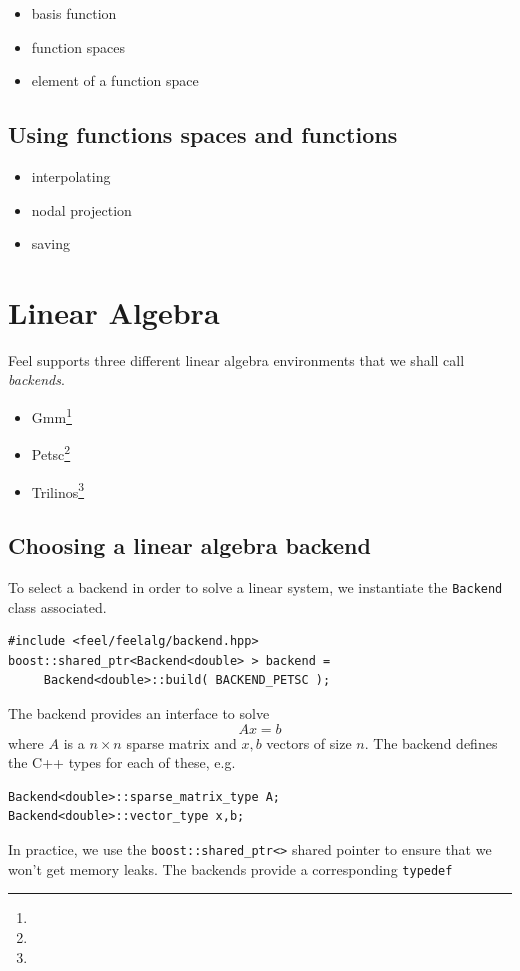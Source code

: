 \documentclass[a4paper]{book}
\newcommand{\cpp}{C{\hspace{-.3em}\vspace{-.2em}\tiny++}\xspace}
\newcommand{\feel}{Feel\xspace}
\begin{document}
\begin{itemize}
\item basis function
\item function spaces
\item element of a function space
\end{itemize}

\subsection{Using functions spaces and functions}

\begin{itemize}
\item interpolating
\item nodal projection
\item saving
\end{itemize}


\section{Linear Algebra}
\label{sec:linear-algebra}


\feel supports three different linear algebra environments that we
shall call \emph{backends}.
\begin{itemize}
\item Gmm\footnote{}
\item Petsc\footnote{}
\item Trilinos\footnote{}
\end{itemize}


\subsection{Choosing a linear algebra backend}
\label{sec:choos-line-algebra}

To select a backend in order to solve a linear system, we instantiate
the \lstinline!Backend! class associated.

\begin{lstlisting}
#include <feel/feelalg/backend.hpp>
boost::shared_ptr<Backend<double> > backend =
     Backend<double>::build( BACKEND_PETSC );
\end{lstlisting}

The backend provides an interface to solve
\begin{equation}
  \label{eq:8}
  A x = b
\end{equation}
\noindent
where $A$ is a $n \times n $ sparse matrix and $x,b$ vectors of size $n$.
The backend defines the \cpp types for  each of these, e.g.
\begin{lstlisting}
Backend<double>::sparse_matrix_type A;
Backend<double>::vector_type x,b;
\end{lstlisting}
\noindent
In practice, we use the \lstinline!boost::shared_ptr<>! shared pointer
to ensure that we won't get memory leaks. The backends provide a
corresponding \lstinline!typedef!
\end{document}
